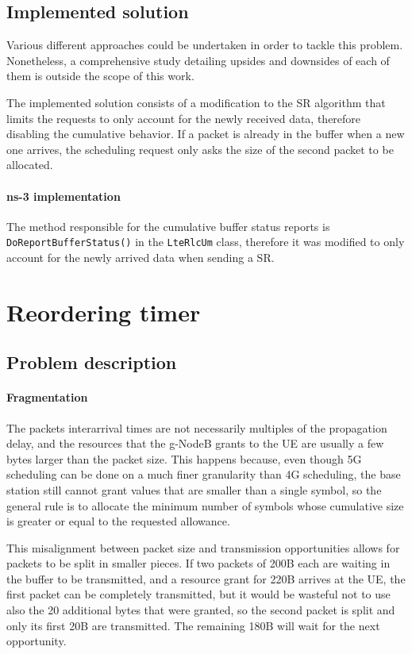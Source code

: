\subsection{Implemented solution}

Various different approaches could be undertaken in order to tackle this problem. Nonetheless, a comprehensive study detailing upsides and downsides of each of them is outside the scope of this work. 

The implemented solution consists of a modification to the \ac{SR} algorithm that limits the requests to only account for the newly received data, therefore disabling the cumulative behavior. If a packet is already in the buffer when a new one arrives, the scheduling request only asks the size of the second packet to be allocated.

\paragraph{ns-3 implementation}
The method responsible for the cumulative buffer status reports is \texttt{DoReportBufferStatus()} in the \texttt{LteRlcUm} class, therefore it was modified to only account for the newly arrived data when sending a \ac{SR}.

\section{Reordering timer}
\label{sec:reord-timer}

\subsection{Problem description}
\paragraph{Fragmentation}
The packets interarrival times are not necessarily multiples of the propagation delay, and the resources that the g-NodeB grants to the \ac{UE} are usually a few bytes larger than the packet size. This happens because, even though 5G scheduling can be done on a much finer granularity than 4G scheduling, the base station still cannot grant values that are smaller than a single symbol, so the general rule is to allocate the minimum number of symbols whose cumulative size is greater or equal to the requested allowance.

This misalignment between packet size and transmission opportunities allows for packets to be split in smaller pieces. If two packets of 200B each are waiting in the buffer to be transmitted, and a resource grant for 220B arrives at the \ac{UE}, the first packet can be completely transmitted, but it would be wasteful not to use also the 20 additional bytes that were granted, so the second packet is split and only its first 20B are transmitted. The remaining 180B will wait for the next opportunity.

